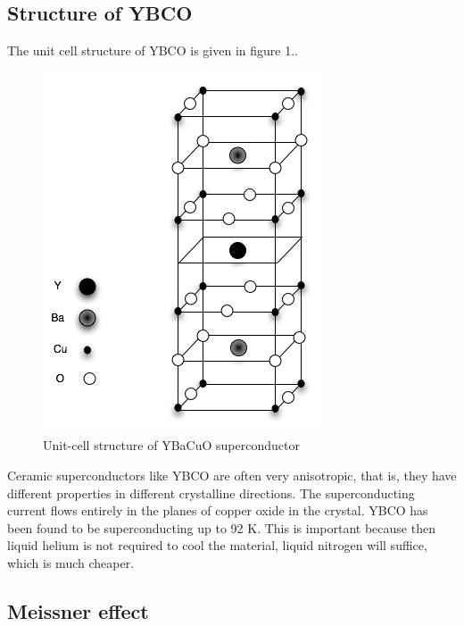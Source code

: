 \documentclass[aps,prl,twocolumn,groupedaddress]{revtex4}
\begin{document}
\subsection{Structure of YBCO}
The unit cell structure of YBCO is given in figure 1.\cite{sheahen}. 

\begin{figure}[htbp]
\begin{center}
\includegraphics[scale=0.8]{YBCO}
\caption{Unit-cell structure of YBaCuO superconductor\cite{sheahen}}
\label{default}
\end{center}
\end{figure}

Ceramic superconductors like YBCO are often very anisotropic, that is, they have different properties in different crystalline directions. The superconducting current flows entirely in the planes of copper oxide in the crystal. YBCO has been found to be superconducting up to 92 K. This is important because then liquid helium is not required to cool the material, liquid nitrogen will suffice, which is much cheaper.
\subsection{Meissner effect}
\end{document}
